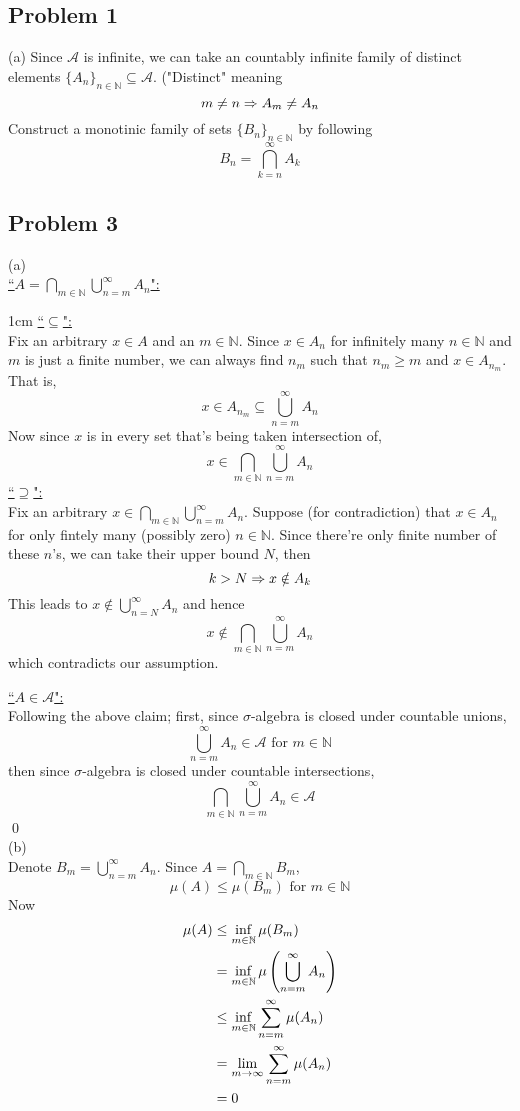 \documentclass[12pt,a4paper]{article}
\newcommand{\ra}[1]{\ifnum #1=1\rightarrow\fi\ifnum #1=2\Rightarrow\fi\ifnum #1=3\Rrightarrow\fi\ifnum #1=4\rightrightarrows\fi\ifnum #1=5\rightleftarrows\fi\ifnum #1=6\mapsto\fi\ifnum #1=7\iffalse\fi\fi\ifnum #1=8\twoheadrightarrow\fi\ifnum #1=9\rightharpoonup\fi\ifnum #1=0\rightharpoondown\fi}
\newcommand{\claim}[1]{\underline{``{#1}":}}
\renewcommand{\l}{\left}\renewcommand{\r}{\right}
\newcommand{\SUM}[2]{\sum\limits_{#1}^{#2}}
\newcommand{\CUP}[2]{\bigcup\limits_{#1}^{#2}}
\newcommand{\CAP}[2]{\bigcap\limits_{#1}^{#2}}
\newcommand{\N}{\mathbb N}%
\begin{document}
\subsection*{Problem 1}
(a) Since $\mathcal A$ is infinite, we can take an countably infinite family of distinct elements $\{A_n\}_{n\in\N} \subseteq \mathcal A$. ("Distinct" meaning 
$$m \neq n \ra2 A_m \neq A_n$$
Construct a monotinic family of sets $\{B_n\}_{n\in\N}$ by following
$$B_n = \CAP{k = n}\infty A_k$$



\newpage
\subsection*{Problem 3}
(a) \\
\claim{$A = \CAP{m \in \N}{} \CUP{n = m}{\infty} A_n$} \\
\begin{adjustwidth}{1cm}{}
\claim{$\subseteq$}\\
Fix an arbitrary $x\in A$ and an $m\in\N$. Since $x \in A_n$ for infinitely many $n\in \N$ and $m$ is just a finite number, we can always find $n_m$ such that $n_m \geq m$ and $x \in A_{n_m}$. That is,
$$x \in A_{n_m} \subseteq \CUP{n = m}\infty A_n$$
Now since $x$ is in every set that's being taken intersection of, 
$$x \in \CAP{m\in\N}{} \CUP{n = m}\infty A_n$$
\claim{$\supseteq$}\\
Fix an arbitrary $x\in \CAP{m \in \N}{} \CUP{n = m}{\infty} A_n$. Suppose (for contradiction) that $x \in A_n$ for only fintely many (possibly zero) $n\in \N$. Since there're only finite number of these $n$'s, we can take their upper bound $N$, then
$$k > N \ra2 x \notin A_k$$
This leads to $x \notin \CUP{n = N}\infty A_n$ and hence 
$$x \notin\CAP{m\in\N}{} \CUP{n = m}\infty A_n$$ which contradicts our assumption. \\
\end{adjustwidth}
\claim{$A \in \mathcal A$}\\
Following the above claim; first, since $\sigma$-algebra is closed under countable unions, 
$$\CUP{n=m}\infty A_n \in \mathcal A \mbox{ for } m \in \N$$
then since $\sigma$-algebra is closed under countable intersections, 
$$\CAP{m\in\N}{}\CUP{n=m}\infty A_n \in \mathcal A$$
\qed \\
(b) \\
Denote $B_m = \CUP{n=m}\infty A_n$. Since $A = \CAP{m \in \N}{} B_m$, 
$$\mu(A) \leq \mu(B_m) \mbox{ for } m \in \N$$
Now 
\begin{align*}
	\mu(A) &\leq  \inf_{m\in\N} \mu(B_m) \\
        &= \inf_{m\in\N} \mu\l(\CUP{n = m}\infty A_n\r) \\
        &\leq \inf_{m\in\N} \SUM{n = m}\infty \mu(A_n) \\
        &= \lim_{m \ra1 \infty} \SUM{n=m}\infty \mu(A_n) \\
        &= 0
\end{align*}
\end{document}
